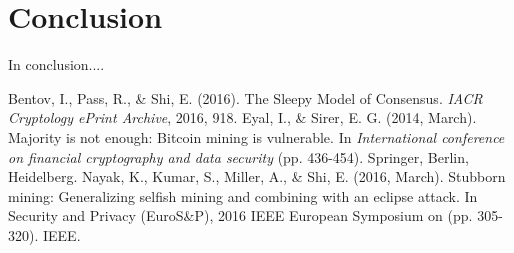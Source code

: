 \documentclass{llncs}
\begin{document}
\section{Conclusion}
In conclusion....


\begin{thebibliography}{}  %

Bentov, I., Pass, R., \& Shi, E. (2016). The Sleepy Model of Consensus. \emph{IACR Cryptology ePrint Archive}, 2016, 918.
Eyal, I., \& Sirer, E. G. (2014, March). Majority is not enough: Bitcoin mining is vulnerable. In \emph{International conference on financial cryptography and data security} (pp. 436-454). Springer, Berlin, Heidelberg.
Nayak, K., Kumar, S., Miller, A., \& Shi, E. (2016, March). Stubborn mining: Generalizing selfish mining and combining with an eclipse attack. In Security and Privacy (EuroS\&P), 2016 IEEE European Symposium on (pp. 305-320). IEEE.
\end{thebibliography}
%
\end{document}
